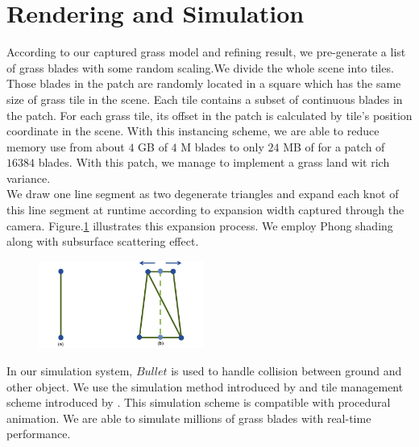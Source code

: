\documentclass[10pt,journal,compsoc]{IEEEtran}
\begin{document}
\section{Rendering and Simulation}\label{sec:render}
According to our captured grass model and refining result, we pre-generate a list of grass blades with some random scaling.We divide the whole scene into tiles. Those blades in the patch are randomly located in a square which has the same size of grass tile in the scene. Each tile contains a subset of continuous blades in the patch. For each grass tile, its offset in the patch is calculated by tile's position coordinate in the scene. With this instancing scheme, we are able to reduce memory use from about $4$ GB of $4$ M blades to only $24$ MB of for a patch of $16384$ blades. With this patch, we manage to implement a grass land wit rich variance.\\

We draw one line segment as two degenerate triangles and expand each knot of this line segment at runtime according to expansion width captured through the camera. Figure.\ref{fig:expasion} illustrates this expansion process. We employ Phong shading along with subsurface scattering effect\cite{sousa2007vegetation}.\\

\begin{figure}
    \centering
    \includegraphics[width=0.48\textwidth]{figs/expansion.jpg}
    \label{fig:expasion}
\end{figure}

In our simulation system, $Bullet$ is used to handle collision between ground and other object. We use the simulation method introduced by \cite{han2012real} and tile management scheme introduced by \cite{fan2015simulation}. This simulation scheme is compatible with procedural animation. We are able to simulate millions of grass blades with real-time performance.
\end{document}
